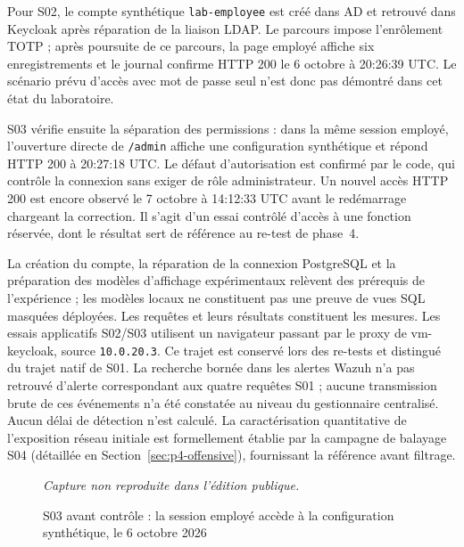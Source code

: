 \documentclass[a4paper,12pt]{report}
\newcommand{\publiccapture}[1]{%
  \begin{figure}[H]\centering
  {\footnotesize\itshape Capture non reproduite dans l'édition publique.}
  \caption{#1}\end{figure}}
\begin{document}
Pour S02, le compte synthétique \texttt{lab-employee} est créé dans AD et retrouvé dans Keycloak après réparation de la liaison LDAP. Le parcours impose l'enrôlement TOTP ; après poursuite de ce parcours, la page employé affiche six enregistrements et le journal confirme HTTP 200 le 6 octobre à 20:26:39 UTC. Le scénario prévu d'accès avec mot de passe seul n'est donc pas démontré dans cet état du laboratoire.

S03 vérifie ensuite la séparation des permissions : dans la même session employé, l'ouverture directe de \texttt{/admin} affiche une configuration synthétique et répond HTTP 200 à 20:27:18 UTC. Le défaut d'autorisation est confirmé par le code, qui contrôle la connexion sans exiger de rôle administrateur. Un nouvel accès HTTP 200 est encore observé le 7 octobre à 14:12:33 UTC avant le redémarrage chargeant la correction. Il s'agit d'un essai contrôlé d'accès à une fonction réservée, dont le résultat sert de référence au re-test de phase~4.

La création du compte, la réparation de la connexion PostgreSQL et la préparation des modèles d'affichage expérimentaux relèvent des prérequis de l'expérience ; les modèles locaux ne constituent pas une preuve de vues SQL masquées déployées. Les requêtes et leurs résultats constituent les mesures. Les essais applicatifs S02/S03 utilisent un navigateur passant par le proxy de vm-keycloak, source \texttt{10.0.20.3}. Ce trajet est conservé lors des re-tests et distingué du trajet natif de S01. La recherche bornée dans les alertes Wazuh n'a pas retrouvé d'alerte correspondant aux quatre requêtes S01 ; aucune transmission brute de ces événements n'a été constatée au niveau du gestionnaire centralisé. Aucun délai de détection n'est calculé. La caractérisation quantitative de l'exposition réseau initiale est formellement établie par la campagne de balayage S04 (détaillée en Section~\ref{sec:p4-offensive}), fournissant la référence avant filtrage.

\publiccapture{S03 avant contrôle : la session employé accède à la configuration synthétique, le 6 octobre 2026}
\end{document}
